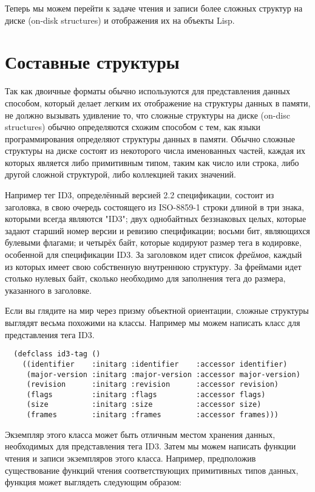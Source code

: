 Теперь мы можем перейти к задаче чтения и записи более сложных структур на диске (on-disk
structures) и отображения их на объекты Lisp.

\section{Составные структуры}

Так как двоичные форматы обычно используются для представления данных способом, который
делает легким их отображение на структуры данных в памяти, не должно вызывать удивление
то, что сложные структуры на диске (on-disc structures) обычно определяются схожим
способом с тем, как языки программирования определяют структуры данных в памяти. Обычно
сложные структуры на диске состоят из некоторого числа именованных частей, каждая их
которых является либо примитивным типом, таким как число или строка, либо другой сложной
структурой, либо коллекцией таких значений.

Например тег ID3, определённый версией 2.2 спецификации, состоит из заголовка, в свою
очередь состоящего из ISO-8859-1 строки длиной в три знака, которыми всегда являются
"ID3"; двух однобайтных беззнаковых целых, которые задают старший номер версии и ревизию
спецификации; восьми бит, являющихся булевыми флагами; и четырёх байт, которые кодируют
размер тега в кодировке, особенной для спецификации ID3. За заголовком идет список
\textit{фреймов}, каждый из которых имеет свою собственную внутреннюю структуру. За
фреймами идет столько нулевых байт, сколько необходимо для заполнения тега до размера,
указанного в заголовке.

Если вы глядите на мир через призму объектной ориентации, сложные структуры выглядят
весьма похожими на классы. Например мы можем написать класс для представления тега ID3.

\begin{lstlisting}
  (defclass id3-tag ()
    ((identifier    :initarg :identifier    :accessor identifier)
     (major-version :initarg :major-version :accessor major-version)
     (revision      :initarg :revision      :accessor revision)
     (flags         :initarg :flags         :accessor flags)
     (size          :initarg :size          :accessor size)
     (frames        :initarg :frames        :accessor frames)))
\end{lstlisting}

Экземпляр этого класса может быть отличным местом хранения данных, необходимых для
представления тега ID3. Затем мы можем написать функции чтения и записи экземпляров этого
класса. Например, предположив существование функций чтения соответствующих примитивных
типов данных, функция  может выглядеть следующим образом:

